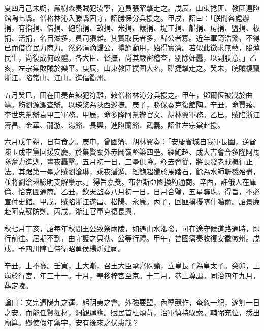\begin{pinyinscope}
夏四月己未朔，嚴樹森奏賊犯汝寧，道員張曜擊走之。戊辰，山東捻匪、教匪連陷館陶七縣。僧格林沁入滕縣固守，詔勝保分兵援之。甲戌，詔曰：「朕聞各處辦捐，有指捐、借捐、砲船捐、畝捐、米捐、饟捐、堤工捐、船捐、房捐、鹽捐、板捐、活捐，名目滋多，員司猥雜。其實取民者多，歸公者寡。近年軍錡浩繁，不得已而借資民力商力。然必涓滴歸公，撙節動用，始得實濟。若似此徵求無藝，朘薄民生，尚復成何政體。各大臣、督撫，尚其嚴密稽查，剔除奸蠹，以副朕意。」乙亥，左宗棠敗賊於樂平。庚辰，山東教匪撲圍大名，聯捷擊走之。癸未，皖賊復竄浙江，陷常山、江山，進偪衢州。

五月癸巳，田在田奏苗練犯符離，敕僧格林沁分兵援之。甲午，鄧爾恆被戕於曲靖。飭劉源灝查辦。以瑛棨為陜西巡撫。庚子，勝保奏克復館陶。辛丑，命賈臻、李世忠幫辦袁甲三軍務。甲辰，命多隆阿幫辦官文、胡林翼軍務。乙巳，賊陷浙江壽昌、金華、龍游、湯谿、長興，進陷蘭谿、武義。詔催左宗棠赴援。

六月戊午朔，日有食之。庚申，曾國籓、胡林翼奏：「安慶省城自我軍長圍，逆酋陳玉成率黨回援安慶，於集賢關外赤岡嶺堅築四壘。經鮑超、成大吉會合多隆阿馬隊奮力進剿，晝夜轟擊。五月初一日，三壘俱降。釋去脅從，將長發老賊概行正法。其踞第一壘之賊劉滄琳，乘夜潛遁。經鮑超殲於馬踏石，餘為水師斬戮殆盡，並將劉滄琳驗明支解梟示。」得旨嘉獎。布魯斯亞國換約通商。辛酉，許俄人在庫倫、恰克圖通商。乙丑，欽天監奏八月初一日，日月合璧，五星聯珠。得旨，不必宣付史館。甲戌，賊陷浙江遂昌、松陽、永康。丙子，回匪撲擾喀什噶爾。詔景廉赴阿克蘇防剿。丙戌，浙江官軍克復長興。

秋七月丁亥，詔每年秋間王公致祭兩陵，如遇山水漲發，可在途守候道路通時，即行前往。屆期不到，由守護之貝勒、公等行禮。甲午，曾國籓奏收復安徽徽州。戊戌，予四川陣亡侍衛昭勇侯楊炘建祠。

辛丑，上不豫。壬寅，上大漸，召王大臣承寫硃諭，立皇長子為皇太子。癸卯，上崩於行宮，年三十一。十月，奉移梓宮至京。十二月，恭上尊謚。同治四年九月，葬定陵。

論曰：文宗遭陽九之運，躬明夷之會。外強要盟，內孽競作，奄忽一紀，遂無一日之安。而能任賢擢材，洞觀肆應。賦民首杜煩苛，治軍慎持馭索。輔弼充位，悉出廟算。鄉使假年禦宇，安有後來之伏患哉？


\end{pinyinscope}